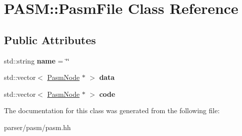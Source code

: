 \hypertarget{classPASM_1_1PasmFile}{}\section{P\+A\+SM\+:\+:Pasm\+File Class Reference}
\label{classPASM_1_1PasmFile}
\subsection*{Public Attributes}
\begin{DoxyCompactItemize}
\item 
\mbox{\label{classPASM_1_1PasmFile_a2aaeda81148758101037e3ab19d6c2b8}} 
std\+::string {\bfseries name} = \char`\"{}\char`\"{}
\item 
\mbox{\label{classPASM_1_1PasmFile_af2bccc19c7ae5597dea5cc2837678a11}} 
std\+::vector$<$ \hyperlink{classPASM_1_1PasmNode}{Pasm\+Node} $\ast$ $>$ {\bfseries data}
\item 
\mbox{\label{classPASM_1_1PasmFile_a7f93f2a0aef7348a4ed8554a6ba86c40}} 
std\+::vector$<$ \hyperlink{classPASM_1_1PasmNode}{Pasm\+Node} $\ast$ $>$ {\bfseries code}
\end{DoxyCompactItemize}


The documentation for this class was generated from the following file\+:\begin{DoxyCompactItemize}
\item 
parser/pasm/pasm.\+hh\end{DoxyCompactItemize}
